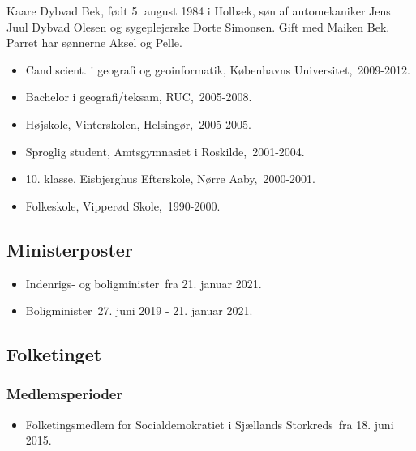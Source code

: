 \documentclass[11pt, a4paper]{awesome-cv}
\begin{document}
\makecvheader[R]
\makelettertitle
\begin{cvletter}
Kaare Dybvad Bek, født 5. august 1984 i Holbæk, søn af automekaniker Jens Juul Dybvad Olesen og sygeplejerske Dorte Simonsen. Gift med Maiken Bek. Parret har sønnerne Aksel og Pelle.

\begin{itemize}
\item Cand.scient. i geografi og geoinformatik, Københavns Universitet, 2009-2012.
\item Bachelor i geografi/teksam, RUC, 2005-2008.
\item Højskole, Vinterskolen, Helsingør, 2005-2005.
\item Sproglig student, Amtsgymnasiet i Roskilde, 2001-2004.
\item 10. klasse, Eisbjerghus Efterskole, Nørre Aaby, 2000-2001.
\item Folkeskole, Vipperød Skole, 1990-2000.
\end{itemize}
\subsection*{Ministerposter}
\begin{itemize}
\item Indenrigs- og boligminister fra 21. januar 2021.
\item Boligminister 27. juni 2019 - 21. januar 2021.
\end{itemize}
\subsection*{Folketinget}
\subsubsection*{Medlemsperioder}
\begin{itemize}
\item Folketingsmedlem for Socialdemokratiet i Sjællands Storkreds fra 18. juni 2015.
\end{itemize}

\end{cvletter}
\end{document}

